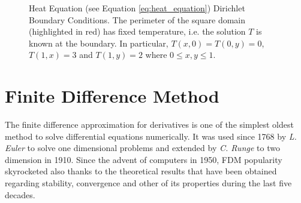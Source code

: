     \begin{center}
	\begin{figure}
    	 \label{fig:heat2d_bc}
    	\caption[Heat Equation Boundary Conditions]{Heat Equation (see Equation \ref{eq:heat_equation}) Dirichlet Boundary Conditions. The perimeter of the square domain (highlighted in red) has fixed temperature, i.e. the solution $T$ is known at the boundary. In particular, $T(x,0)=T(0,y)=0$, $T(1,x)=3$ and $T(1,y)=2$ where $0\leq x,y\leq 1$. }\label{fig:heat2d_bc}
	\end{figure}
\end{center} 

    \section{Finite Difference Method}
The finite difference approximation for derivatives is one of the simplest oldest method to solve differential equations numerically. It was used since 1768 by \textit{L. Euler} to solve one dimensional problems and extended by \textit{C. Runge} to two dimension in 1910. Since the advent of computers in 1950, FDM  popularity skyrocketed also thanks to the theoretical results that have been obtained regarding stability, convergence and other of its properties during the last five decades.

